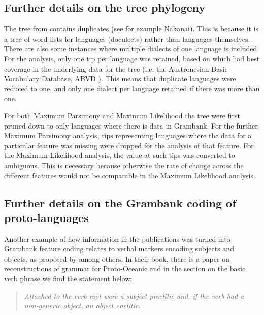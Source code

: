 \documentclass[a4paper,10pt]{article} %
\begin{document}
\subsection{Further details on the tree phylogeny}
\label{supp:tree_details}

The tree from \citet{grayetal_2009} contains duplicates (see for example Nakanai). This is because it is a tree of word-lists for languages (doculects) rather than languages themselves. There are also some instances where multiple dialects of one language is included. For the analysis, only one tip per language was retained, based on which had best coverage in the underlying data for the tree (i.e. the Austronesian Basic Vocabulary Database, ABVD \citep{ABVD}). This means that duplicate languages were reduced to one, and only one dialect per language retained if there was more than one. 


For both Maximum Parsimony and Maximum Likelihood the tree were first pruned down to only languages where there is data in Grambank. For the further Maximum Parsimony analysis, tips representing languages where the data for a particular feature was missing were dropped for the analysis of that feature. For the Maximum Likelihood analysis, the value at such tips was converted to ambiguous. This is necessary because otherwise the rate of change across the different features would not be comparable in the Maximum Likelihood analysis.


\subsection{Further details on the Grambank coding of proto-languages }
\label{supp:proto_lg_coding}
Another example of how information in the publications was turned into Grambank feature coding relates to verbal markers encoding subjects and objects, as proposed by \citet{lynchrosscrowley_proto_grammar_oceanic} among others. In their book, there is a paper on reconstructions of grammar for Proto-Oceanic and in the section on the basic verb phrase we find the statement below:

\begin{quotation}
\noindent\emph{Attached to the verb root were a subject proclitic and, if the verb had a non-generic object, an object enclitic.} \end{quotation} \begin{flushright} \citet[83]{lynchrosscrowley_proto_grammar_oceanic} \end{flushright}
\end{document}
